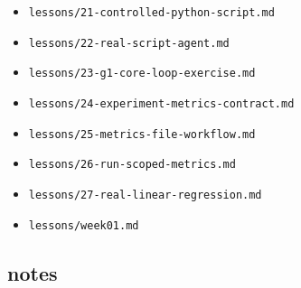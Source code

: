 \begin{itemize}
\item \nolinkurl{lessons/21-controlled-python-script.md}
\item \nolinkurl{lessons/22-real-script-agent.md}
\item \nolinkurl{lessons/23-g1-core-loop-exercise.md}
\item \nolinkurl{lessons/24-experiment-metrics-contract.md}
\item \nolinkurl{lessons/25-metrics-file-workflow.md}
\item \nolinkurl{lessons/26-run-scoped-metrics.md}
\item \nolinkurl{lessons/27-real-linear-regression.md}
\item \nolinkurl{lessons/week01.md}
\end{itemize}

\subsection{notes}
